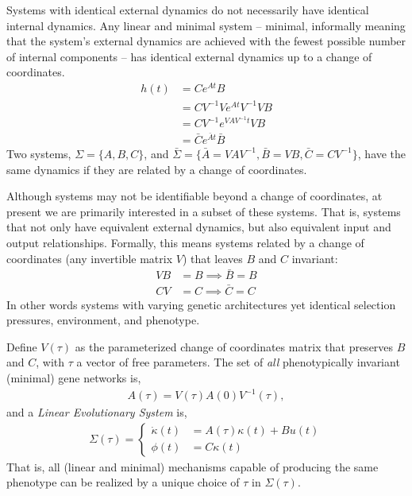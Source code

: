 \documentclass{article}
\newcommand{\1}{\mathbbm{1}}
\begin{document}
  Systems with identical external dynamics do not necessarily have identical internal dynamics. Any linear and minimal system -- minimal, informally meaning that the system's external dynamics are achieved with the fewest possible number of internal components -- has identical external dynamics up to a change of coordinates. 
  \begin{align}
    h(t) &= C e^{A t} B \\
    &= C V^{-1} V e^{A t} V^{-1} V B \\
    &= C V^{-1} e^{V A V^{-1} t} V B \\
    &= \bar{C} e^{\bar{A} t} \bar{B}
  \end{align}
  Two systems, $\Sigma = \{ A, B, C \}$, and $\bar{\Sigma} = \{\bar{A} = VAV^{-1}, \bar{B} = VB, \bar{C} = CV^{-1} \}$, have the same dynamics if they are related by a change of coordinates. 

  Although systems may not be identifiable beyond a change of coordinates, at present we are primarily interested in a subset of these systems. That is, systems that not only have equivalent external dynamics, but also equivalent input and output relationships. Formally, this means systems related by a change of coordinates (any invertible matrix $V$) that leaves $B$ and $C$ invariant:
  \begin{align}
    VB &= B \implies \bar{B} = B \\
    CV &= C \implies \bar{C} = C
  \end{align}
  In other words systems with varying genetic architectures yet identical selection pressures, environment, and phenotype. 

  Define $V(\tau)$ as the parameterized change of coordinates matrix that preserves $B$ and $C$, with $\tau$ a vector of free parameters. The set of \emph{all} phenotypically invariant (minimal) gene networks is, 
  \begin{align}
    A(\tau) = V(\tau) A(0) V^{-1}(\tau) ,
  \end{align}
  and a \emph{Linear Evolutionary System} is, 
  \begin{align}
    \Sigma(\tau) = \left\{ \begin{array}{ll} \dot{\kappa}(t) &= A(\tau) \kappa(t) + B u(t) \\ \phi(t) &= C \kappa(t) \end{array} \right .
  \end{align}
  That is, all (linear and minimal) mechanisms capable of producing the same phenotype can be realized by a unique choice of $\tau$ in $\Sigma(\tau)$.
\end{document}
